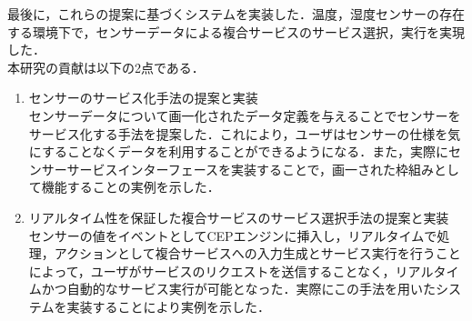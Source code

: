 \documentclass{kuisthesis}			%
\begin{document}
\begin{jabstract}
最後に，これらの提案に基づくシステムを実装した．温度，湿度センサーの存在する環境下で，センサーデータによる複合サービスのサービス選択，実行を実現した．\\
本研究の貢献は以下の2点である．
\begin{enumerate}
\item センサーのサービス化手法の提案と実装\\
センサーデータについて画一化されたデータ定義を与えることでセンサーをサービス化する手法を提案した．これにより，ユーザはセンサーの仕様を気にすることなくデータを利用することができるようになる．また，実際にセンサーサービスインターフェースを実装することで，画一された枠組みとして機能することの実例を示した．
\item リアルタイム性を保証した複合サービスのサービス選択手法の提案と実装\\
センサーの値をイベントとしてCEPエンジンに挿入し，リアルタイムで処理，アクションとして複合サービスへの入力生成とサービス実行を行うことによって，ユーザがサービスのリクエストを送信することなく，リアルタイムかつ自動的なサービス実行が可能となった．実際にこの手法を用いたシステムを実装することにより実例を示した．
\end{enumerate}
\end{jabstract}
\end{document}
